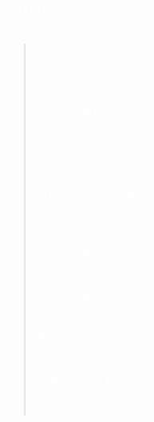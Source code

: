 \section*{\textcolor{white}{?????}}
\begin{quote}
	\textcolor{white}{ ニレ\\
		千本樱溶入夜中}

	\textcolor{white}{ノモカナイヨ\\
		连你的声音也传不到啊}

	\textcolor{white}{は の\\
		此处开宴钢铁牢笼中}

	\textcolor{white}{そのでろして\\
		自那断头台上往下看吧}

	\ \\

	\textcolor{white}{　\\
		三千世界黄泉之暗}

	\textcolor{white}{クモコエナイヨ\\
		连哀叹之歌也听不见啊}

	\textcolor{white}{の　かかなた\\
		青蓝天空遥远彼端}

	\textcolor{white}{そのでいて\\
		就用那光线枪射穿吧}

	\begin{flushright}\textcolor{white}{------「千本桜」}\end{flushright}
\end{quote}
\newpage